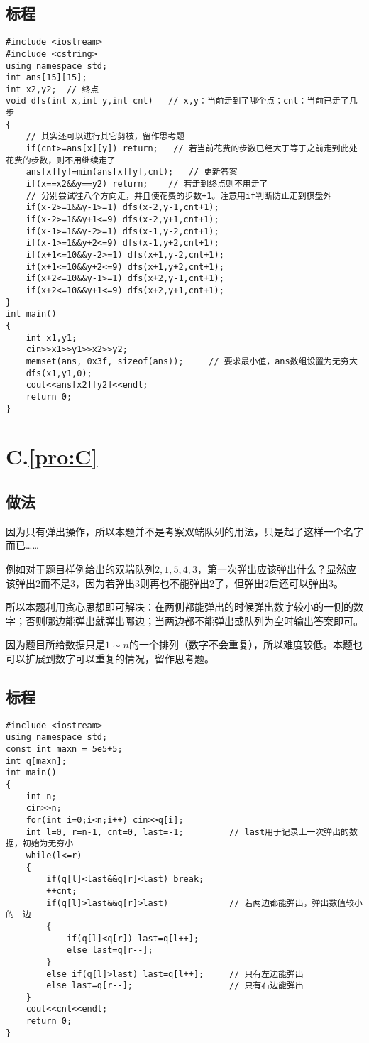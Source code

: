 \documentclass[
    lang=cn,
    color=blue
]{elegantbook}
\newcommand{\solutionheader}[1]{
    \chapter*{#1.\quad \ref*{pro:#1}}
    \addcontentsline{toc}{chapter}{A.\ref*{pro:#1}}
}
\begin{document}
\section*{标程}
\begin{lstlisting}
#include <iostream>
#include <cstring>
using namespace std;
int ans[15][15];
int x2,y2;  // 终点
void dfs(int x,int y,int cnt)   // x,y：当前走到了哪个点；cnt：当前已走了几步
{
    // 其实还可以进行其它剪枝，留作思考题
    if(cnt>=ans[x][y]) return;   // 若当前花费的步数已经大于等于之前走到此处花费的步数，则不用继续走了
    ans[x][y]=min(ans[x][y],cnt);   // 更新答案
    if(x==x2&&y==y2) return;    // 若走到终点则不用走了
    // 分别尝试往八个方向走，并且使花费的步数+1。注意用if判断防止走到棋盘外
    if(x-2>=1&&y-1>=1) dfs(x-2,y-1,cnt+1);
    if(x-2>=1&&y+1<=9) dfs(x-2,y+1,cnt+1);
    if(x-1>=1&&y-2>=1) dfs(x-1,y-2,cnt+1);
    if(x-1>=1&&y+2<=9) dfs(x-1,y+2,cnt+1);
    if(x+1<=10&&y-2>=1) dfs(x+1,y-2,cnt+1);
    if(x+1<=10&&y+2<=9) dfs(x+1,y+2,cnt+1);
    if(x+2<=10&&y-1>=1) dfs(x+2,y-1,cnt+1);
    if(x+2<=10&&y+1<=9) dfs(x+2,y+1,cnt+1);
}
int main()
{
    int x1,y1;
    cin>>x1>>y1>>x2>>y2;
    memset(ans, 0x3f, sizeof(ans));     // 要求最小值，ans数组设置为无穷大
    dfs(x1,y1,0);
    cout<<ans[x2][y2]<<endl;
    return 0;
}
\end{lstlisting}

\solutionheader{C}
\section*{做法}
因为只有弹出操作，所以本题并不是考察双端队列的用法，只是起了这样一个名字而已……

例如对于题目样例给出的双端队列$2,1,5,4,3$，第一次弹出应该弹出什么？显然应该弹出$2$而不是$3$，因为若弹出3则再也不能弹出$2$了，但弹出$2$后还可以弹出$3$。

所以本题利用贪心思想即可解决：在两侧都能弹出的时候弹出数字较小的一侧的数字；否则哪边能弹出就弹出哪边；当两边都不能弹出或队列为空时输出答案即可。

因为题目所给数据只是$1 \sim n$的一个排列（数字不会重复），所以难度较低。本题也可以扩展到数字可以重复的情况，留作思考题。

\section*{标程}
\begin{lstlisting}
#include <iostream>
using namespace std;
const int maxn = 5e5+5;
int q[maxn];
int main()
{
    int n;
    cin>>n;
    for(int i=0;i<n;i++) cin>>q[i];
    int l=0, r=n-1, cnt=0, last=-1;         // last用于记录上一次弹出的数据，初始为无穷小
    while(l<=r)
    {
        if(q[l]<last&&q[r]<last) break;
        ++cnt;
        if(q[l]>last&&q[r]>last)            // 若两边都能弹出，弹出数值较小的一边
        {
            if(q[l]<q[r]) last=q[l++];
            else last=q[r--];
        }
        else if(q[l]>last) last=q[l++];     // 只有左边能弹出
        else last=q[r--];                   // 只有右边能弹出
    }
    cout<<cnt<<endl;
    return 0;
}
\end{lstlisting}
\end{document}

